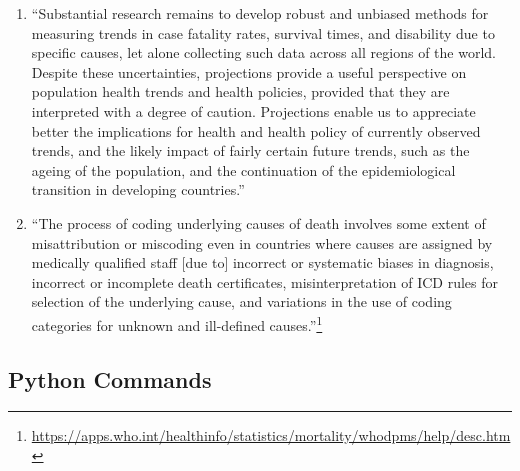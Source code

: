 \documentclass[10pt, a4paper, twocolumn]{IEEEconf}
\begin{document}
\begin{enumerate}
  \item \enquote{Substantial research remains to develop robust and unbiased methods for measuring trends in case fatality rates, survival times, and disability due to specific causes, let alone collecting such data across all regions of the world. Despite these uncertainties, projections provide a useful perspective on population health trends and health policies, provided that they are interpreted with a degree of caution. Projections enable us to appreciate better the implications for health and health policy of currently observed trends, and the likely impact of fairly certain future trends, such as the ageing of the population, and the continuation of the epidemiological transition in developing countries.} \citep{mathers2006projections}
  \item \enquote{The process of coding underlying causes of death involves some extent of misattribution or miscoding even in countries where causes are assigned by medically qualified staff [due to] incorrect or systematic biases in diagnosis, incorrect or incomplete death certificates, misinterpretation of ICD rules for selection of the underlying cause, and variations in the use of coding categories for unknown and ill-defined causes.}\footnote{\scriptsize{\url{https://apps.who.int/healthinfo/statistics/mortality/whodpms/help/desc.htm}}}
\end{enumerate}

\onecolumn
\subsection{Python Commands}
\end{document}
